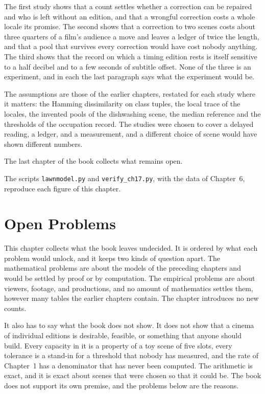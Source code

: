 \documentclass[11pt,twoside,openright]{book}
\theoremstyle{plain}
\theoremstyle{definition}
\theoremstyle{remark}
\begin{document}
The first study shows that a count settles whether a correction can be repaired and who is left without an edition, and that a wrongful correction costs a whole locale its promise. The second shows that a correction to two scenes costs about three quarters of a film's audience a move and leaves a ledger of twice the length, and that a pool that survives every correction would have cost nobody anything. The third shows that the record on which a timing edition rests is itself sensitive to a half decibel and to a few seconds of subtitle offset. None of the three is an experiment, and in each the last paragraph says what the experiment would be.

The assumptions are those of the earlier chapters, restated for each study where it matters: the Hamming dissimilarity on class tuples, the local trace of the locales, the invented pools of the dishwashing scene, the median reference and the thresholds of the occupation record. The studies were chosen to cover a delayed reading, a ledger, and a measurement, and a different choice of scene would have shown different numbers.

The last chapter of the book collects what remains open.

The scripts \texttt{lawnmodel.py} and \texttt{verify\_ch17.py}, with the data of Chapter~6, reproduce each figure of this chapter.

\chapter{Open Problems}
\label{ch:open}

This chapter collects what the book leaves undecided. It is ordered by what each problem would unlock, and it keeps two kinds of question apart. The mathematical problems are about the models of the preceding chapters and would be settled by proof or by computation. The empirical problems are about viewers, footage, and productions, and no amount of mathematics settles them, however many tables the earlier chapters contain. The chapter introduces no new counts.

It also has to say what the book does not show. It does not show that a cinema of individual editions is desirable, feasible, or something that anyone should build. Every capacity in it is a property of a toy scene of five slots, every tolerance is a stand-in for a threshold that nobody has measured, and the rate of Chapter~1 has a denominator that has never been computed. The arithmetic is exact, and it is exact about scenes that were chosen so that it could be. The book does not support its own premise, and the problems below are the reasons.
\end{document}
